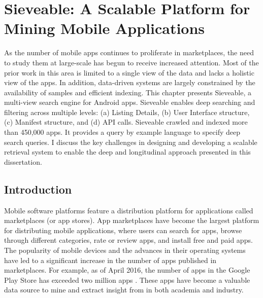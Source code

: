 \chapter{Sieveable: A Scalable Platform for Mining Mobile Applications}
\label{ch:sieveable_chapter}
As the number of mobile apps continues to proliferate in marketplaces, the need to study them at large-scale has begun to receive increased attention. 
Most of the prior work in this area is limited to a single view of the data  and lacks a  holistic view of the apps. 
In addition, data-driven systems are largely constrained by the availability of samples and efficient indexing.
This chapter presents Sieveable, a multi-view search engine for Android apps.
Sieveable enables deep searching and filtering across multiple levels: (a) Listing Details, (b) User Interface structure, (c) Manifest structure, and (d) API calls. 
Sieveable crawled and indexed more than 450,000 apps.
It provides a query by example language to specify deep search queries.
I discuss the key challenges in designing and developing a scalable retrieval system to enable the deep and longitudinal approach presented in this dissertation.

\section{Introduction}
Mobile software platforms feature a distribution platform for applications called marketplaces (or app stores).
App marketplaces have become the largest platform for distributing mobile applications, where users can search for apps, browse through different categories, rate or review apps, and install free and paid apps.
The popularity of mobile devices and the advances in their operating systems have led to a significant increase in the number of apps published in marketplaces.
For example, as of April 2016, the number of apps in the Google Play Store has exceeded two million apps \cite{appbrain_play_apps}.
These apps have become a valuable data source to mine and extract insight from in both academia and industry.

